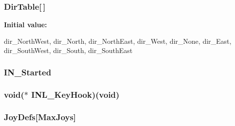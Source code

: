 \label{ID__IN_8C_a8486d18dcabfa7a32dc114edc70ae0c6}
\hypertarget{ID__IN_8C_abe09b447128a6d0eabbcc212e97a0e8b}{
\subsubsection[{DirTable}]{ {\bf DirTable}\mbox{[}$\,$\mbox{]}}}
\label{ID__IN_8C_abe09b447128a6d0eabbcc212e97a0e8b}
{\bfseries Initial value:}
\begin{DoxyCode}
                
                                        {
                                                dir_NorthWest,  dir_North,      
      dir_NorthEast,
                                                dir_West,               dir_None,
              dir_East,
                                                dir_SouthWest,  dir_South,      
      dir_SouthEast
                                        }
\end{DoxyCode}
\hypertarget{ID__IN_8C_af28bee013911f8a1eec5bfd5367588cf}{
\subsubsection[{IN\_\-Started}]{ {\bf IN\_\-Started}}}
\label{ID__IN_8C_af28bee013911f8a1eec5bfd5367588cf}
\hypertarget{ID__IN_8C_aba302ab4ccb121b8b433e0072ab45fc9}{
\subsubsection[{INL\_\-KeyHook}]{\setlength{\rightskip}{0pt plus 5cm}void($\ast$ {\bf INL\_\-KeyHook})(void)}}
\label{ID__IN_8C_aba302ab4ccb121b8b433e0072ab45fc9}
\hypertarget{ID__IN_8C_a9a0430b044ebc95c3a6fab27fd89531f}{
\subsubsection[{JoyDefs}]{ {\bf JoyDefs}\mbox{[}MaxJoys\mbox{]}}}
